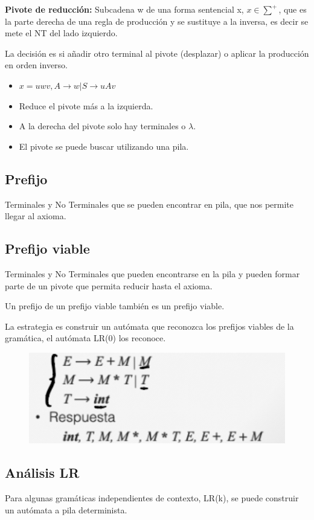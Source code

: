 \documentclass[12pt, twoside, openright]{report} %
\begin{document}
\textbf{Pivote de reducción:} Subcadena w de una forma sentencial x, $x \in \sum^+$, que es la parte derecha de una regla de producción y se sustituye a la inversa, es decir se mete el NT del lado izquierdo. 

La decisión es si añadir otro terminal al pivote (desplazar) o aplicar la producción en orden inverso.
\begin{itemize}
  \item $x=uwv, A \rightarrow w | S \rightarrow uAv$
  \item Reduce el pivote más a la izquierda.
  \item A la derecha del pivote solo hay terminales o $\lambda$.
  \item El pivote se puede buscar utilizando una pila.
\end{itemize}

\subsection{Prefijo} 
Terminales y No Terminales que se pueden encontrar en pila, que nos permite llegar al axioma.

\subsection{Prefijo viable} 
Terminales y No Terminales que pueden encontrarse en la pila y pueden formar parte de un pivote que permita reducir hasta el axioma. 

Un prefijo de un prefijo viable también es un prefijo viable.

La estrategia es construir un autómata que reconozca los prefijos viables de la gramática, el autómata LR(0) los reconoce.
\vspace{-10px}
\begin{figure}[H]
	{\includegraphics[scale=.4]{2021-03-26 18_27_20-ASintactico.pdf - Foxit Reader.png}}
\end{figure}
  
\subsection{Análisis LR}
Para algunas gramáticas independientes de contexto, LR(k), se puede construir un autómata a pila determinista.
\end{document}
